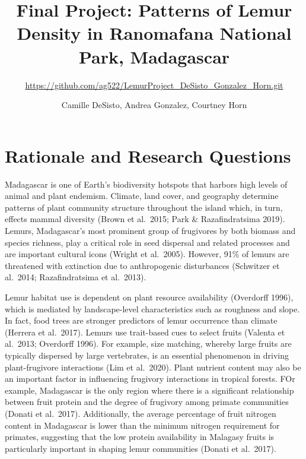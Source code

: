 \documentclass[
  12pt,
]{article}
\title{Final Project: Patterns of Lemur Density in Ranomafana National
Park, Madagascar}
\subtitle{\url{https://github.com/ag522/LemurProject_DeSisto_Gonzalez_Horn.git}}
\author{Camille DeSisto, Andrea Gonzalez, Courtney Horn}
\date{}
\begin{document}
\maketitle

\newpage
\tableofcontents 
\newpage
\listoftables 
\newpage
\listoffigures 
\newpage

\hypertarget{rationale-and-research-questions}{%
\section{Rationale and Research
Questions}\label{rationale-and-research-questions}}

Madagascar is one of Earth's biodiversity hotspots that harbors high
levels of animal and plant endemism. Climate, land cover, and geography
determine patterns of plant community structure throughout the island
which, in turn, effects mammal diversity (Brown et al.~2015; Park \&
Razafindratsima 2019). Lemurs, Madagascar's most prominent group of
frugivores by both biomass and species richness, play a critical role in
seed dispersal and related processes and are important cultural icons
(Wright et al.~2005). However, 91\% of lemurs are threatened with
extinction due to anthropogenic disturbances (Schwitzer et al.~2014;
Razafindratsima et al.~2013).

Lemur habitat use is dependent on plant resource availability (Overdorff
1996), which is mediated by landscape-level characteristics such as
roughness and slope. In fact, food trees are stronger predictors of
lemur occurrence than climate (Herrera et al.~2017). Lemurs use
trait-based cues to select fruits (Valenta et al.~2013; Overdorff 1996).
For example, size matching, whereby large fruits are typically dispersed
by large vertebrates, is an essential phenomenon in driving
plant-frugivore interactions (Lim et al.~2020). Plant nutrient content
may also be an important factor in influencing frugivory interactions in
tropical forests. FOr example, Madagascar is the only region where there
is a significant relationship between fruit protein and the degree of
frugivory among primate communities (Donati et al.~2017). Additionally,
the average percentage of fruit nitrogen content in Madagascar is lower
than the minimum nitrogen requirement for primates, suggesting that the
low protein availability in Malagasy fruits is particularly important in
shaping lemur communities (Donati et al.~2017).
\end{document}

